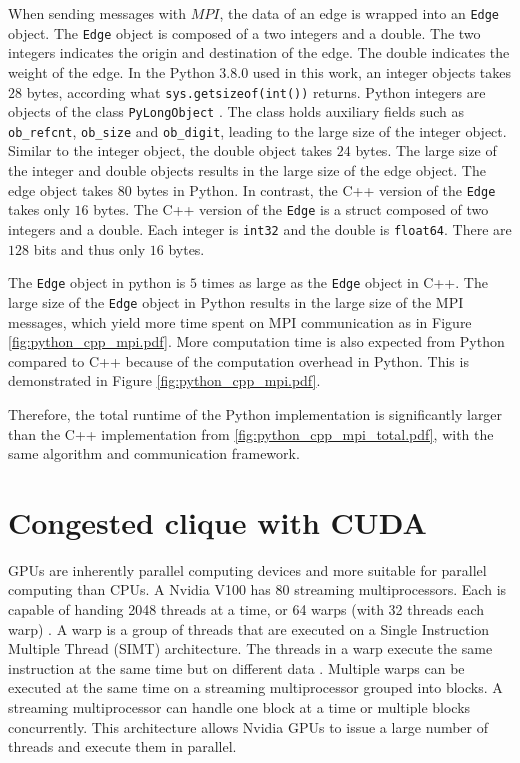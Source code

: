 \documentclass[english, 12pt, a4paper, elec, utf8, a-2b, online]{aaltothesis}
\begin{document}
When sending messages with $MPI$, the data of an edge is wrapped into an \texttt{Edge} object. The \texttt{Edge} object is composed of a two integers and a double. The two integers indicates the origin and destination of the edge. The double indicates the weight of the edge. In the Python 3.8.0 used in this work, an integer objects takes $28$ bytes, according what \texttt{sys.getsizeof(int())} returns. Python integers are objects of the class \texttt{PyLongObject} \cite{PythonInt}. The class holds auxiliary fields such as \texttt{ob\_refcnt}, \texttt{ob\_size} and \texttt{ob\_digit}, leading to the large size of the integer object. Similar to the integer object, the double object takes $24$ bytes. The large size of the integer and double objects results in the large size of the edge object. The edge object takes $80$ bytes in Python. In contrast, the C++ version of the \texttt{Edge} takes only $16$ bytes. The C++ version of the \texttt{Edge} is a struct composed of two integers and a double. Each integer is \texttt{int32} and the double is \texttt{float64}. There are $128$ bits and thus only $16$ bytes.

The \texttt{Edge} object in python is $5$ times as large as the \texttt{Edge} object in C++. The large size of the \texttt{Edge} object in Python results in the large size of the MPI messages, which yield more time spent on MPI communication as in Figure \cref{fig:python_cpp_mpi.pdf}. More computation time is also expected from Python compared to C++ because of the computation overhead in Python. This is demonstrated in Figure \cref{fig:python_cpp_mpi.pdf}.

Therefore, the total runtime of the Python implementation is significantly larger than the C++ implementation from \cref{fig:python_cpp_mpi_total.pdf}, with the same algorithm and communication framework.
\clearpage

\section{Congested clique with CUDA}
\label{sec:cuda}
GPUs are inherently parallel computing devices and more suitable for parallel computing than CPUs. A Nvidia V100 \cite{PuhtiDoc} has 80 streaming multiprocessors. Each is capable of handing 2048 threads at a time, or 64 warps (with 32 threads each warp) \cite{V100Architecture}. A warp is a group of threads that are executed on a Single Instruction Multiple Thread (SIMT) architecture. The threads in a warp execute the same instruction at the same time but on different data \cite{Simtarch}. Multiple warps can be executed at the same time on a streaming multiprocessor grouped into blocks. A streaming multiprocessor can handle one block at a time or multiple blocks concurrently. This architecture allows Nvidia GPUs to issue a large number of threads and execute them in parallel.
\end{document}
